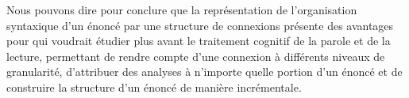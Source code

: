 {    \begin{figure}
    \caption{\label{fig:}}
    \end{figure}

    Nous pouvons dire pour conclure que la représentation de l’organisation syntaxique d’un énoncé par une structure de connexions présente des avantages pour qui voudrait étudier plus avant le traitement cognitif de la parole et de la lecture, permettant de rendre compte d’une connexion à différents niveaux de granularité, d’attribuer des analyses à n’importe quelle portion d’un énoncé et de construire la structure d’un énoncé de manière incrémentale.
}
